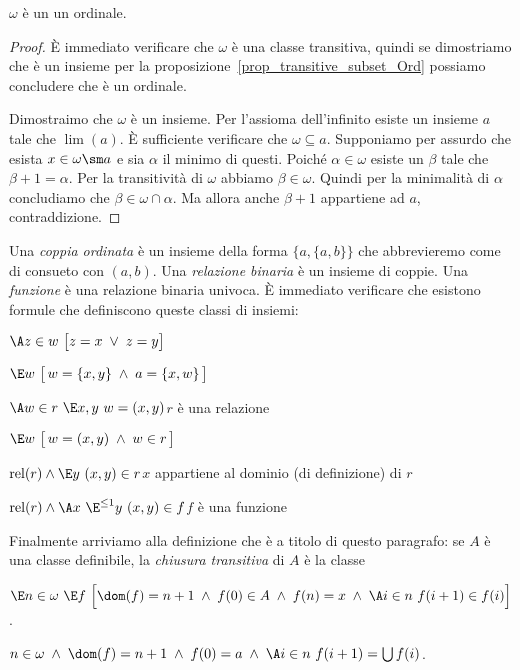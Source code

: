 \begin{proposition}
$\omega$ \`e un un ordinale.
\end{proposition}

\begin{proof}
\`E immediato verificare che $\omega$ \`e una classe transitiva, quindi se dimostriamo che \`e un insieme per la proposizione~\ref{prop_transitive_subset_Ord} possiamo concludere che \`e un ordinale. 

Dimostraimo che $\omega$ \`e un insieme. Per l'assioma dell'infinito esiste un insieme $a$ tale che $\lim(a)$. \`E sufficiente verificare che $\omega\subseteq a$. Supponiamo per assurdo che esista $x\in\omega\sm a$ e sia $\alpha$ il minimo di questi. Poich\'e $\alpha\in\omega$ esiste un $\beta$ tale che $\beta+1=\alpha$. Per la transitivit\`a di $\omega$ abbiamo $\beta\in\omega$. Quindi per la minimalit\`a di $\alpha$ concludiamo che $\beta\in \omega\cap\alpha$. Ma allora anche $\beta+1$ appartiene ad $a$, contraddizione.
\end{proof}

Una \emph{coppia ordinata\/} \`e un insieme della forma $\big\{a,\{a,b\}\big\}$ che abbrevieremo come di consueto con $(a,b)$. Una \emph{relazione binaria\/} \`e un insieme di coppie. Una \emph{funzione\/} \`e una relazione binaria univoca. \`E immediato verificare che esistono formule che definiscono queste classi di insiemi:

$\A z\in w\ \big[z=x\;\vee\; z=y\big]$

 $\E w\ \big[\,w=\{x,y\}\;\wedge\; a=\{x,w\}\,\big]$

$\A w\in r\ \E x,y\ w=(x,y)$\hfill $r$ \`e una relazione

 $\E w\ \big[\,w=(x,y)\;\wedge\; w\in r\,\big]$

$\rel(r) \wedge \E y\ (x,y)\in r$\hfill $x$ appartiene al dominio (di definizione) di $r$

$\rel(r) \wedge \A x\ \E^{\le 1} y\ (x,y)\in f$\hfill $f$ \`e una funzione


Finalmente arriviamo alla definizione che \`e a titolo di questo paragrafo: se $A$ \`e una classe definibile, la \emph{chiusura transitiva\/} di $A$ \`e la classe
\def\TC{{\rm TC}}

\ceq{$x\in\TC(A)$}{$\dIFF$} $\E n\in\omega\ \E f\ \Big[\dom(f)=n+1\;\wedge\; f(0)\in A\;\wedge\;f(n)=x\;\wedge\;\A i\in n\ f(i+1)\in f(i)\Big]$.


 $n\in\omega\;\wedge\;\dom(f)=n+1\;\wedge\; f(0)= a\;\wedge\;\A i\in n\ f(i+1)=\bigcup f(i)$.


 

